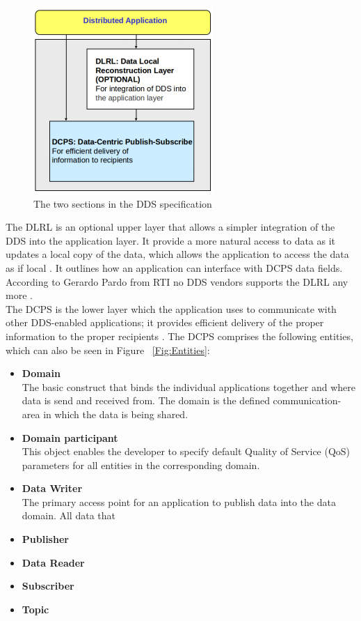 \documentclass[Main]{subfiles}
\begin{document}
\begin{figure}[H]
\centering
\includegraphics[scale=1]{Figure/DLRLandDCPS.png}
\caption{The two sections in the DDS specification \cite{DDS-slides}}
\label{Fig:DLRL}
\end{figure}

The DLRL is an optional upper layer that allows a simpler integration of the DDS into the application layer. It provide a more natural access to data as it updates a local copy of the data, which allows the application to access the data as if local \cite{DDS-slides}. It outlines how an application can interface with DCPS data fields. According to Gerardo Pardo from RTI no DDS vendors supports the DLRL any more \cite{DLRL-support}.\\
The DCPS is the lower layer which the application uses to communicate with other DDS-enabled applications; it provides efficient delivery of the proper information to the proper recipients \cite{wiki-DDS}. The DCPS comprises the following entities, which can also be seen in Figure ~\ref{Fig:Entities}:
\begin{itemize}
  \item \textbf{Domain}\\The basic construct that binds the individual applications together and where data is send and received from. The domain is the defined communication-area in which the data is being shared.
  \item \textbf{Domain participant}\\This object enables the developer to specify default Quality of Service (QoS) parameters for all entities in the corresponding domain.
  \item \textbf{Data Writer}\\The primary access point for an application to publish data into the data domain. All data that 
  \item \textbf{Publisher}
  \item \textbf{Data Reader}
  \item \textbf{Subscriber}
  \item \textbf{Topic}
  \\\cite{RTI}
\end{itemize}
\end{document}
